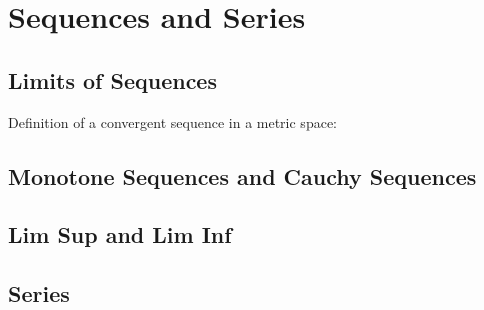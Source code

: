 \section{Sequences and Series}
\subsection{Limits of Sequences}

Definition of a convergent sequence in a metric space: \label{metric_space_sequence}


\subsection{Monotone Sequences and Cauchy Sequences}
\subsection{Lim Sup and Lim Inf}
\subsection{Series}